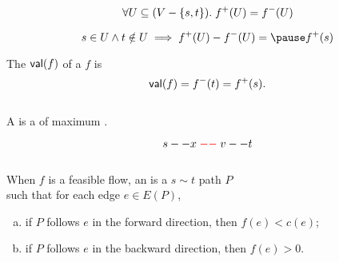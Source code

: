 \begin{frame}{}

  \pause
  \[
    \forall U \subseteq (V - \{s, t\}).\; f^{+}(U) = f^{-}(U)
  \]

  \pause
  \[
    s \in U \land t \notin U \implies f^{+}(U) - f^{-}(U) = \pause f^{+}(s)
  \]
\end{frame}

\begin{frame}{}
  \begin{definition}[Value (值)]
    The  $\textsf{val}(f)$ of a  $f$ is
    \[
      \textsf{val}(f) = f^{-}(t) = f^{+}(s).
    \]
  \end{definition}

  \vspace{0.30cm}
  \begin{columns}
      \pause
  \end{columns}

  \pause
  \vspace{0.50cm}
  \begin{definition}
    A  is a  of maximum .
  \end{definition}
\end{frame}

\begin{frame}{}
  \[
    s -- x \;\textcolor{red}{--}\; v -- t
  \]
  \vspace{-0.30cm}
  \begin{columns}
  \end{columns}

  \pause
  \vspace{0.30cm}
  \begin{definition}
    When $f$ is a feasible flow, an  is a $s \sim t$ path $P$ \\
     such that for each edge $e \in E(P)$,
    \begin{enumerate}[(a)]
      \item if $P$ follows $e$ in the forward direction, then $f(e) < c(e)$;
      \item if $P$ follows $e$ in the backward direction, then $f(e) > 0$.
    \end{enumerate}
  \end{definition}
\end{frame}

